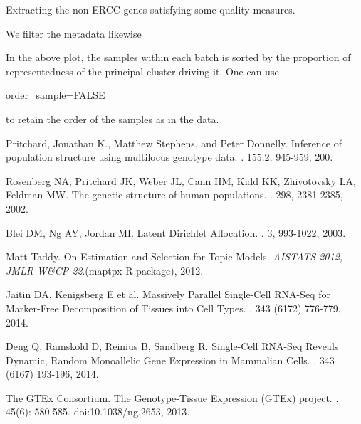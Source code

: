 \documentclass[12pt]{article}\usepackage[]{graphicx}\usepackage[usenames,dvipsnames]{color}
\begin{document}
Extracting the non-ERCC genes satisfying some quality measures.



We filter the metadata likewise







\begin{figure}[htp]
\begin{center}

\end{center}
\end{figure}

In the above plot, the samples within each batch is sorted by the proportion of representedness of the principal cluster driving it. One can use \begin{verb} order_sample=FALSE \end{verb} to retain the order of the samples as in the data.

\begin{figure}[htp]
\begin{center}

\end{center}
\end{figure}

\begin{thebibliography}{1}

Pritchard, Jonathan K., Matthew Stephens, and Peter Donnelly.
\newblock Inference of population structure using multilocus genotype data.
. 155.2,  945-959, 200.

Rosenberg NA, Pritchard JK,  Weber JL, Cann HM,  Kidd KK,  Zhivotovsky LA,  Feldman MW.
\newblock The genetic structure of human populations.
. 298,  2381-2385, 2002.

Blei DM,  Ng AY, Jordan MI.
\newblock Latent Dirichlet Allocation.
. 3, 993-1022, 2003.

Matt Taddy.
\newblock On Estimation and Selection for Topic Models.
\newblock \textit{AISTATS 2012, JMLR W\&CP 22}.(maptpx R package), 2012.

Jaitin DA,  Kenigsberg E et al.
\newblock Massively Parallel Single-Cell RNA-Seq for Marker-Free Decomposition of Tissues into Cell Types.
. 343 (6172) 776-779, 2014.

Deng Q,  Ramskold D,  Reinius B,  Sandberg R.
\newblock Single-Cell RNA-Seq Reveals Dynamic, Random Monoallelic Gene Expression in Mammalian Cells.
.  343 (6167) 193-196, 2014.

The GTEx Consortium.
\newblock The Genotype-Tissue Expression (GTEx) project.
. 45(6): 580-585. doi:10.1038/ng.2653, 2013.

\end{thebibliography}
\end{document}
